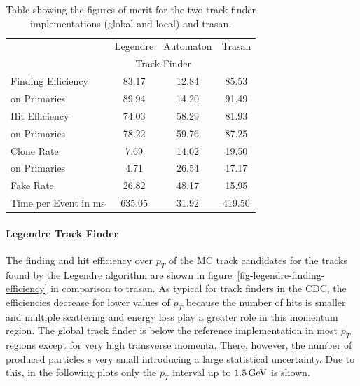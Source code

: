 \begin{table}
  \caption{Table showing the figures of merit for the two track finder implementations (global and local) and trasan.}
  \centering
  \begin{tabular}{lccc} \toprule
    & Legendre & Automaton & Trasan \\ 
    & \multicolumn{2}{c}{Track Finder} & \\ \midrule
    Finding Efficiency & 83.17 & 12.84 & 85.53 \\
    \quad on Primaries & 89.94 & 14.20 & 91.49 \\ 
    Hit Efficiency     & 74.03 & 58.29 & 81.93 \\
    \quad on Primaries & 78.22 & 59.76 & 87.25 \\ 
    Clone Rate         & 7.69  & 14.02 & 19.50 \\
    \quad on Primaries & 4.71  & 26.54 & 17.17 \\ 
    Fake Rate          & 26.82 & 48.17 & 15.95 \\ 
    Time per Event in ms & 635.05 & 31.92 & 419.50 \\ \bottomrule
  \end{tabular}
  \label{tab-old-implementation-results}
\end{table}

\paragraph{Legendre Track Finder}
The finding and hit efficiency over $p_T$ of the MC track candidates for the tracks found by the Legendre algorithm are shown in figure~\ref{fig-legendre-finding-efficiency} in comparison to trasan. As typical for track finders in the CDC, the efficiencies decrease for lower values of $p_T$ because the number of hits is smaller and multiple scattering and energy loss play a greater role in this momentum region. The global track finder is below the reference implementation in most $p_T$ regions except for very high transverse momenta. There, however, the number of produced particles s very small introducing a large statistical uncertainty. Due to this, in the following plots only the $p_T$ interval up to $\unit[1.5]{GeV}$ is shown.

